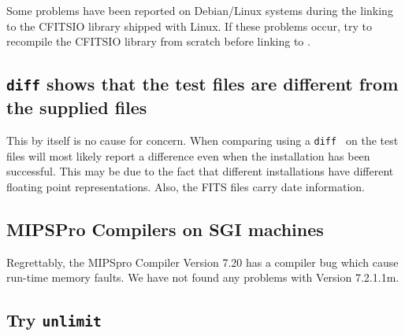 \documentclass[12pt,twoside]{article}
\begin{document}
Some problems have been reported on Debian/Linux systems during the
linking to the CFITSIO library shipped with Linux. If these problems
occur, try to recompile the CFITSIO library from scratch before linking
to \healpix.






\subsection{{\tt diff} shows that the test files are different from
the supplied files}

This by itself is no cause for concern. When comparing using a
{\tt diff } on the test files will most likely report a
difference even when the installation has been successful. 
This  may be due to the fact that
different installations  have different floating point
representations. Also, the FITS files carry date information.

\subsection{MIPSPro Compilers on SGI machines}

Regrettably, the MIPSpro Compiler Version 7.20 has a compiler bug
which cause run-time memory faults. We have not found any problems
with Version 7.2.1.1m.

\subsection{Try {\tt unlimit}}
\end{document}
